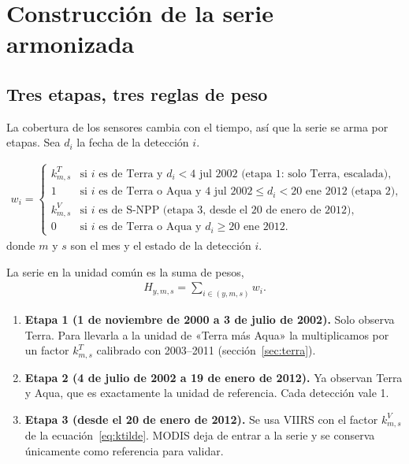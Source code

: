 \chapter{Construcción de la serie armonizada}\label{cap:serie}

\section{Tres etapas, tres reglas de peso}\label{sec:etapas}

La cobertura de los sensores cambia con el tiempo, así que la serie se arma por etapas. Sea $d_i$ la fecha de la detección $i$.

\begin{definicion}
\begin{align*}
  w_i=\begin{cases}
    k^{T}_{m,s} & \text{si } i\text{ es de Terra y } d_i<\text{4 jul 2002 (etapa 1: solo Terra, escalada)},\\[2pt]
    1 & \text{si } i\text{ es de Terra o Aqua y } \text{4 jul 2002}\le d_i<\text{20 ene 2012 (etapa 2)},\\[2pt]
    k^{V}_{m,s} & \text{si } i\text{ es de S-NPP (etapa 3, desde el 20 de enero de 2012)},\\[2pt]
    0 & \text{si } i\text{ es de Terra o Aqua y } d_i\ge\text{20 ene 2012}.
  \end{cases}
\end{align*}
donde $m$ y $s$ son el mes y el estado de la detección $i$.
\end{definicion}

La serie en la unidad común es la suma de pesos,
\begin{align*}
  H_{y,m,s}=\sum_{i\in(y,m,s)}w_i.
\end{align*}

\begin{enumerate}[label=\arabic*)]
  \item \textbf{Etapa 1 (1 de noviembre de 2000 a 3 de julio de 2002).} Solo observa Terra. Para llevarla a la unidad de «Terra más Aqua» la multiplicamos por un factor $k^T_{m,s}$ calibrado con 2003--2011 (sección~\ref{sec:terra}).
  \item \textbf{Etapa 2 (4 de julio de 2002 a 19 de enero de 2012).} Ya observan Terra y Aqua, que es exactamente la unidad de referencia. Cada detección vale 1.
  \item \textbf{Etapa 3 (desde el 20 de enero de 2012).} Se usa VIIRS con el factor $k^{V}_{m,s}$ de la ecuación~\eqref{eq:ktilde}. MODIS deja de entrar a la serie y se conserva únicamente como referencia para validar.
\end{enumerate}

